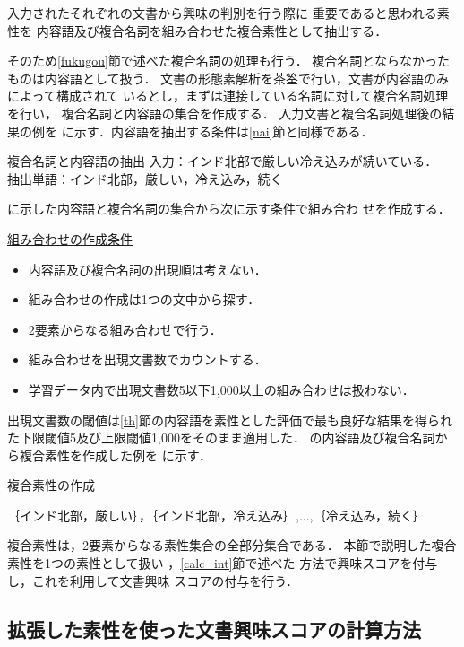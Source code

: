 \documentclass[japanese]{jnlp_1.4}
\newcounter{ex}
\def\ex#1{}
\def\exref#1{}
\begin{document}
入力されたそれぞれの文書から興味の判別を行う際に
重要であると思われる素性を
内容語及び複合名詞を組み合わせた複合素性として抽出する．

そのため\ref{fukugou}節で述べた複合名詞の処理も行う．
複合名詞とならなかったものは内容語として扱う．
文書の形態素解析を茶筌で行い，文書が内容語のみによって構成されて
いるとし，まずは連接している名詞に対して複合名詞処理を行い，
複合名詞と内容語の集合を作成する．
入力文書と複合名詞処理後の結果の例を\exref{ex複合}
に示す．内容語を抽出する条件は\ref{nai}節と同様である．

\begin{itembox}{
\ex{}\label{ex複合}複合名詞と内容語の抽出
}
入力：インド北部で厳しい冷え込みが続いている．\\
抽出単語：インド北部，厳しい，冷え込み，続く
\end{itembox}

\exref{ex複合}に示した内容語と複合名詞の集合から次に示す条件で組み合わ
せを作成する．

\underline{組み合わせの作成条件}
\begin{itemize}
\item 内容語及び複合名詞の出現順は考えない．
\item 組み合わせの作成は1つの文中から探す．
\item 2要素からなる組み合わせで行う．
\item 組み合わせを出現文書数でカウントする．
\item 学習データ内で出現文書数5以下1,000以上の組み合わせは扱わない．
\end{itemize}

出現文書数の閾値は\ref{th}節の内容語を素性とした評価で最も良好な結果を得られ
た下限閾値5及び上限閾値1,000をそのまま適用した．
\exref{ex複合}の内容語及び複合名詞から複合素性を作成した例を
\exref{extaple}に示す．

\begin{itembox}{
\ex{}\label{extaple}複合素性の作成
}
\begin{center}
｛インド北部，厳しい｝，｛インド北部，冷え込み｝,...,｛冷え込み，続く｝
\end{center}
\end{itembox}

複合素性は，2要素からなる素性集合の全部分集合である．
本節で説明した複合素性を1つの素性として扱い
，\ref{calc_int}節で述べた
方法で興味スコアを付与し，これを利用して文書興味
スコアの付与を行う．

\subsection{拡張した素性を使った文書興味スコアの計算方法}
\end{document}
